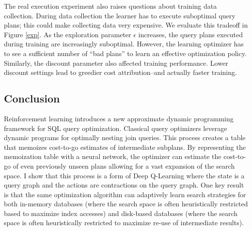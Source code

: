 The real execution experiment also raises questions about training data collection. During data collection the learner has to execute suboptimal query plans; this could make collecting data very expensive. We evaluate this tradeoff in Figure \ref{exp}. As the exploration parameter $\epsilon$ increases, the query plans executed during training are increasingly suboptimal. However, the learning optimizer has to see a sufficient number of ``bad plans'' to learn an effective optimization policy. Similarly, the discount parameter also affected training performance. Lower discount settings lead to greedier cost attribution--and actually faster training. 


\subsection*{Conclusion}
Reinforcement learning introduces a new approximate dynamic programming framework for SQL query optimization. Classical query optimizers leverage dynamic programs for optimally nesting join queries. This process creates a table that memoizes cost-to-go estimates of intermediate subplans. By representing the memoization table with a neural network, the optimizer can estimate the cost-to-go of even previously unseen plans allowing for a vast expansion of the search space. I show that this process is a form of Deep Q-Learning where the state is a query graph and the actions are contractions on the query graph. One key result is that the same optimization algorithm can adaptively learn search strategies for both in-memory databases (where the search space is often heuristically restricted based to maximize index accesses) and disk-based databases (where the search space is often heuristically restricted to maximize re-use of intermediate results).